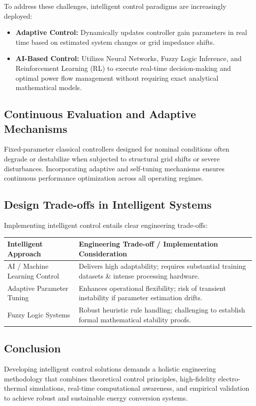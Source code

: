 \documentclass[12pt,a4paper]{article}
\begin{document}
To address these challenges, intelligent control paradigms are increasingly deployed:
\begin{itemize}
    \item \textbf{Adaptive Control:} Dynamically updates controller gain parameters in real time based on estimated system changes or grid impedance shifts.
    \item \textbf{AI-Based Control:} Utilizes Neural Networks, Fuzzy Logic Inference, and Reinforcement Learning (RL) to execute real-time decision-making and optimal power flow management without requiring exact analytical mathematical models.
\end{itemize}

\subsection{Continuous Evaluation and Adaptive Mechanisms}
Fixed-parameter classical controllers designed for nominal conditions often degrade or destabilize when subjected to structural grid shifts or severe disturbances. Incorporating adaptive and self-tuning mechanisms ensures continuous performance optimization across all operating regimes.

\subsection{Design Trade-offs in Intelligent Systems}
Implementing intelligent control entails clear engineering trade-offs:

\begin{center}
\renewcommand{\arraystretch}{1.4}
\begin{tabularx}{\textwidth}{|>{\raggedright\arraybackslash}p{3.5cm}|X|}
\hline
\textbf{Intelligent Approach} & \textbf{Engineering Trade-off / Implementation Consideration} \\
\hline
AI / Machine Learning Control & Delivers high adaptability; requires substantial training datasets \& intense processing hardware. \\
\hline
Adaptive Parameter Tuning & Enhances operational flexibility; risk of transient instability if parameter estimation drifts. \\
\hline
Fuzzy Logic Systems & Robust heuristic rule handling; challenging to establish formal mathematical stability proofs. \\
\hline
\end{tabularx}
\end{center}

\subsection{Conclusion}
Developing intelligent control solutions demands a holistic engineering methodology that combines theoretical control principles, high-fidelity electro-thermal simulations, real-time computational awareness, and empirical validation to achieve robust and sustainable energy conversion systems.
\end{document}
